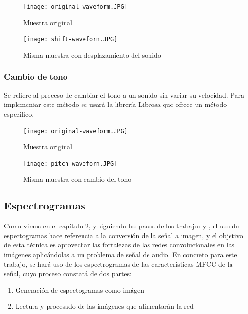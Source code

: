 \documentclass[11pt,a4paper,spanish]{book}
\begin{document}
		\begin{figure}[!htb]
			\begin{minipage}{0.45\textwidth}
				\centering
				\texttt{[image: original-waveform.JPG]}
				\caption{Muestra original}
				\label{ref:audio_original_2}
			\end{minipage}\hfill 
			\begin{minipage}{0.45\textwidth}
				\centering
				\texttt{[image: shift-waveform.JPG]}\hfill
				\caption{Misma muestra con desplazamiento del sonido}
				\label{ref:audio_shiftting}
			\end{minipage}
		\end{figure}
		
		\subsubsection{Cambio de tono}
		Se refiere al proceso de cambiar el tono a un sonido sin variar su velocidad. Para implementar este método se usará la librería Librosa que ofrece un método específico.
		
		\begin{figure}[!htb]
			\begin{minipage}{0.45\textwidth}
				\centering
				\texttt{[image: original-waveform.JPG]}
				\caption{Muestra original}
				\label{ref:audio_original_3}
			\end{minipage}\hfill 
			\begin{minipage}{0.45\textwidth}
				\centering
				\texttt{[image: pitch-waveform.JPG]}\hfill
				\caption{Misma muestra con cambio del tono}
				\label{ref:audio_tunning}
			\end{minipage}
		\end{figure}
	
	
	\subsection{Espectrogramas}
	Como vimos en el capítulo 2, y siguiendo los pasos de los trabajos \cite{Anvarjon2020} y \cite{Mustaqeem2020}, el uso de espectogramas hace referencia a la conversión de la señal a imagen, y el objetivo de esta técnica es aprovechar las fortalezas de las redes convolucionales en las imágenes aplicándolas a un problema de señal de audio. En concreto para este trabajo, se hará uso de los espectrogramas de las características MFCC de la señal, cuyo proceso constará de dos partes: 
	\begin{enumerate}
		\item Generación de espectogramas como imágen
		\item Lectura y procesado de las imágenes que alimentarán la red
	\end{enumerate}
\end{document}
